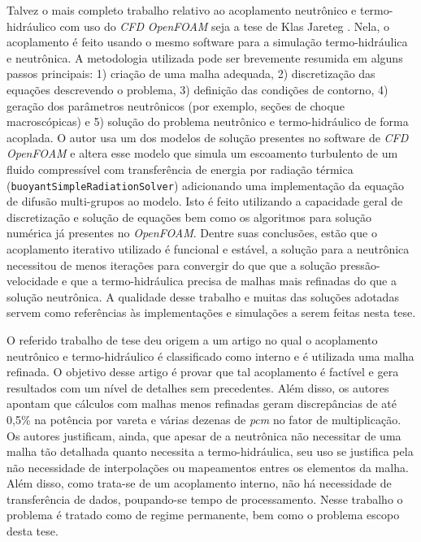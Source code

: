 Talvez o mais completo trabalho relativo ao acoplamento neutrônico e termo-hidráulico com uso do 
\textit{CFD} \textit{OpenFOAM} seja a tese de Klas Jareteg \cite{Jareteg2012}. Nela, o acoplamento é feito usando o mesmo 
software para a simulação termo-hidráulica e neutrônica. A metodologia utilizada pode ser brevemente 
resumida em alguns passos principais: 1) criação de uma malha adequada, 2) discretização das 
equações descrevendo o problema, 3) definição das condições de contorno, 4) geração dos 
parâmetros neutrônicos (por exemplo, seções de choque macroscópicas) e 5) solução do 
problema neutrônico e termo-hidráulico de forma acoplada. O autor usa um dos modelos de solução presentes no 
software de \textit{CFD} \textit{OpenFOAM} \cite{OpenFOAM2013} e 
altera esse modelo que simula um escoamento turbulento de um fluido compressível com transferência de energia
por radiação térmica (\texttt{buoyantSimpleRadiationSolver}) adicionando uma implementação da equação de difusão multi-grupos 
ao modelo. Isto é feito utilizando a capacidade geral de discretização e solução de equações bem como os algoritmos 
para solução numérica já presentes no \textit{OpenFOAM}. Dentre suas conclusões, estão que o acoplamento iterativo 
utilizado é funcional e estável, a solução para a neutrônica necessitou de menos iterações para convergir 
do que que a solução pressão-velocidade e que a termo-hidráulica precisa de malhas mais refinadas do que a solução 
neutrônica. A qualidade desse trabalho e muitas das soluções adotadas servem como referências às implementações 
e simulações a serem feitas nesta tese.

O referido trabalho de tese deu origem a um artigo \cite{Jareteg2014} no qual o acoplamento
neutrônico e termo-hidráulico é classificado como interno e é utilizada uma malha
refinada. O objetivo desse artigo é provar que
tal acoplamento é factível e gera resultados com um nível de detalhes sem precedentes. Além
disso, os autores apontam que cálculos com malhas menos refinadas geram discrepâncias
de até 0,5\% na potência por vareta e várias dezenas de \textit{pcm} no fator de multiplicação.
Os autores justificam, ainda, que apesar de a neutrônica não necessitar de uma malha
tão detalhada quanto necessita a termo-hidráulica, seu uso se justifica pela não necessidade
de interpolações ou mapeamentos entres os elementos da malha. Além disso, como trata-se
de um acoplamento interno, não há necessidade de transferência de dados, poupando-se
tempo de processamento.
Nesse trabalho o problema é tratado como de regime permanente, bem como o problema escopo
desta tese.


